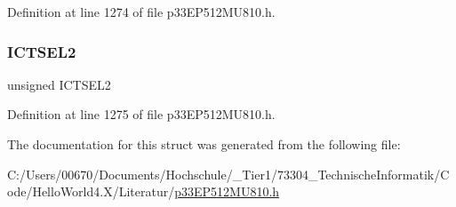Definition at line 1274 of file p33\+E\+P512\+M\+U810.\+h.

\mbox{\label{structtag_i_c14_c_o_n1_b_i_t_s_a47d80892d449e6edbd5ba2ba9ff06deb}} 
\subsubsection{\texorpdfstring{I\+C\+T\+S\+E\+L2}{ICTSEL2}}
{\footnotesize\ttfamily unsigned I\+C\+T\+S\+E\+L2}



Definition at line 1275 of file p33\+E\+P512\+M\+U810.\+h.



The documentation for this struct was generated from the following file\+:\begin{DoxyCompactItemize}
\item 
C\+:/\+Users/00670/\+Documents/\+Hochschule/\+\_\+\+Tier1/73304\+\_\+\+Technische\+Informatik/\+Code/\+Hello\+World4.\+X/\+Literatur/\hyperlink{p33_e_p512_m_u810_8h}{p33\+E\+P512\+M\+U810.\+h}\end{DoxyCompactItemize}

